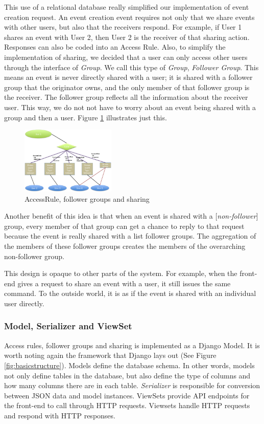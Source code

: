 \documentclass[a4paper]{article}
\begin{document}
This use of a relational database really simplified our implementation of event creation request. An event creation event requires not only that we share events with other users, but also that the receivers respond. For example, if User 1 shares an event with User 2, then User 2 is the receiver of that sharing action. Responses can also be coded into an Access Rule. Also, to simplify the implementation of sharing, we decided that a user can only access other users through the interface of \emph{Group}. We call this type of \emph{Group}, \emph{Follower Group}. This means an event is never directly shared with a user; it is shared with a follower group that the originator owns, and the only member of that follower group is the receiver. The follower group reflects all the information about the receiver user. This way, we do not not have to worry about an event being shared with a group and then a user. Figure \ref{fig:sharing2} illustrates just this. 

\begin{figure}[h]
\centering
\includegraphics[width=0.4\textwidth]{sharing2.png}
\caption{\label{fig:sharing2}AccessRule, follower groups and sharing}
\end{figure}

Another benefit of this idea is that when an event is shared with a [\emph{non-follower}] group, every member of that group can get a chance to reply to that request because the event is really shared with a list follower groups. The aggregation of the members of these follower groups creates the members of the overarching non-follower group. 

This design is opaque to other parts of the system. For example, when the front-end gives a request to share an event with a user, it still issues the same command. To the outside world, it is as if the event is shared with an individual user directly.

\subsubsection{Model, Serializer and ViewSet}
Access rules, follower groups and sharing is implemented as a Django Model. It is worth noting again the framework that Django lays out (See Figure \ref{fig:basicstructure}). Models define the database schema. In other words, models not only define tables in the database, but also define the type of columns and how many columns there are in each table. \emph{Serializer} is responsible for conversion between JSON data and model instances. ViewSets provide API endpoints for the front-end to call through HTTP requests. Viewsets handle HTTP requests and respond with HTTP responses. 
\end{document}

